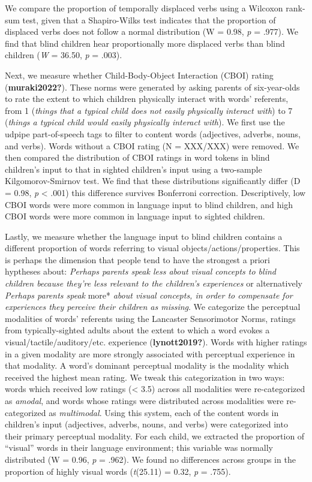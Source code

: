 \documentclass[
  man,floatsintext]{apa6}
\begin{document}
We compare the proportion of temporally displaced verbs using a Wilcoxon rank-sum test, given that a Shapiro-Wilks test indicates that the proportion of displaced verbs does not follow a normal distribution (W = 0.98, \emph{p} = .977). We find that blind children hear proportionally more displaced verbs than blind children (\emph{W} = 36.50, \emph{p} = .003).

Next, we measure whether Child-Body-Object Interaction (CBOI) rating (\textbf{muraki2022?}). These norms were generated by asking parents of six-year-olds to rate the extent to which children physically interact with words' referents, from 1 (\emph{things that a typical child does not easily physically interact with}) to 7 (\emph{things a typical child would easily physically interact with}). We first use the udpipe part-of-speech tags to filter to content words (adjectives, adverbs, nouns, and verbs). Words without a CBOI rating (N = XXX/XXX) were removed. We then compared the distribution of CBOI ratings in word tokens in blind children's input to that in sighted children's input using a two-sample Kilgomorov-Smirnov test. We find that these distributions significantly differ (D = 0.98, \emph{p} \textless{} .001) this difference survives Bonferroni correction. Descriptively, low CBOI words were more common in language input to blind children, and high CBOI words were more common in language input to sighted children.

Lastly, we measure whether the language input to blind children contains a different proportion of words referring to visual objects/actions/properties. This is perhaps the dimension that people tend to have the strongest a priori hyptheses about: \emph{Perhaps parents speak less about visual concepts to blind children because they're less relevant to the children's experiences} or alternatively \emph{Perhaps parents speak} more* \emph{about visual concepts, in order to compensate for experiences they perceive their children as missing}. We categorize the perceptual modalities of words' referents using the Lancaster Sensorimotor Norms, ratings from typically-sighted adults about the extent to which a word evokes a visual/tactile/auditory/etc. experience (\textbf{lynott2019?}). Words with higher ratings in a given modality are more strongly associated with perceptual experience in that modality. A word's dominant perceptual modality is the modality which received the highest mean rating. We tweak this categorization in two ways: words which received low ratings (\textless{} 3.5) across all modalities were re-categorized as \emph{amodal}, and words whose ratings were distributed across modalities were re-categorized as \emph{multimodal}. Using this system, each of the content words in children's input (adjectives, adverbs, nouns, and verbs) were categorized into their primary perceptual modality. For each child, we extracted the proportion of ``visual'' words in their language environment; this variable was normally distributed (W = 0.96, \emph{p} = .962). We found no differences across groups in the proportion of highly visual words (\emph{t}(25.11) = 0.32, \emph{p} = .755).
\end{document}
